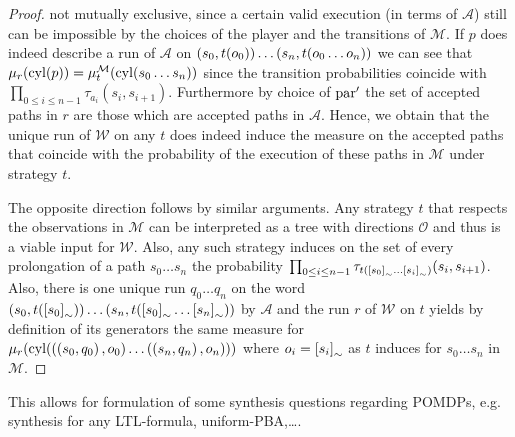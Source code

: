 \begin{proof}
  not mutually exclusive, since a certain valid execution (in terms of
  $\mathcal{A}$) still can be impossible by the choices of the player and the
  transitions of $\mathcal{M}$. If $p$ does indeed describe a run of
  $\mathcal{A}$ on $\left(s_{0}, t(o_{0})\right)\dots\left(s_{n},t(o_{0}\dots o_{n})\right)$
  we can see that
  $\mu_{r}(\operatorname{cyl}(p)) = \mu_{t}^{\mathcal{M}}(\operatorname{cyl}(s_{0}\dots s_{n}))$ since the
  transition probabilities coincide with
  $\prod_{0\leq i\leq n-1}\tau_{a_{i}}(s_{i}, s_{i+1})$.
  Furthermore by choice of $\operatorname{par}'$ the set of accepted paths in $r$ are
  those which are accepted paths in $\mathcal{A}$. Hence, we obtain that the
  unique run of $\mathcal{W}$ on any $t$ does indeed induce the measure on the
  accepted paths that coincide with the probability of the execution of these
  paths in $\mathcal{M}$ under strategy $t$.

  The opposite direction follows by similar arguments. Any strategy $t$ that
  respects the observations in $\mathcal{M}$ can be interpreted as a tree with
  directions $\mathcal{O}$ and thus is a viable input for $\mathcal{W}$. Also,
  any such strategy induces on the set of every prolongation of a path
  $s_{0}\dots s_{n}$ the probability
  $\prod_{0\leq i\leq n-1}\tau_{
    t(\left[s_{0}\right]_{\sim}\dots\left[s_{i}\right]_{\sim})}(s_{i}, s_{i+1})$.
  Also, there is one unique run $q_{0}\dots q_{n}$ on the word
  $\left(s_{0},t(\left[s_{0}\right]_{\sim})\right)\dots
   \left(s_{n},t(\left[s_{0}\right]_{\sim}\dots\left[s_{n}\right]_{\sim})\right)$ by
  $\mathcal{A}$ and the run $r$ of $\mathcal{W}$ on $t$ yields by definition of
  its generators the same measure for $\mu_{r}(\operatorname{cyl}(\left(\left(s_{0},q_{0}\right),
  o_{0}\right)\dots\left(\left(s_{n},q_{n}\right), o_{n}\right)))$ where
  $o_{i}= \left[s_{i}\right]_{\sim}$ as $t$ induces for $s_{0}\dots s_{n}$ in
  $\mathcal{M}$.
\end{proof}
This allows for formulation of some synthesis questions regarding \acp{POMDP},
e.g. synthesis for any LTL-formula, uniform-\ac{PBA},\dots.

